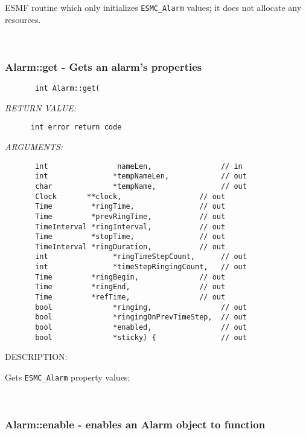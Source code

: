         ESMF routine which only initializes {\tt ESMC\_Alarm} values;
        it does not allocate any resources.  
   
 
\mbox{}\hrulefill\ 
 
\subsubsection [Alarm::get] {Alarm::get - Gets an alarm's properties}


  
\begin{verbatim}       int Alarm::get(\end{verbatim}{\em RETURN VALUE:}
\begin{verbatim}      int error return code\end{verbatim}{\em ARGUMENTS:}
\begin{verbatim}       int                nameLen,                // in
       int               *tempNameLen,            // out
       char              *tempName,               // out
       Clock       **clock,                  // out
       Time         *ringTime,               // out
       Time         *prevRingTime,           // out
       TimeInterval *ringInterval,           // out
       Time         *stopTime,               // out
       TimeInterval *ringDuration,           // out
       int               *ringTimeStepCount,      // out
       int               *timeStepRingingCount,   // out
       Time         *ringBegin,              // out
       Time         *ringEnd,                // out
       Time         *refTime,                // out
       bool              *ringing,                // out
       bool              *ringingOnPrevTimeStep,  // out
       bool              *enabled,                // out
       bool              *sticky) {               // out\end{verbatim}
{\sf DESCRIPTION:\\ }


        Gets {\tt ESMC\_Alarm} property values;
   
 
\mbox{}\hrulefill\ 
 
\subsubsection [Alarm::enable] {Alarm::enable - enables an Alarm object to function}


